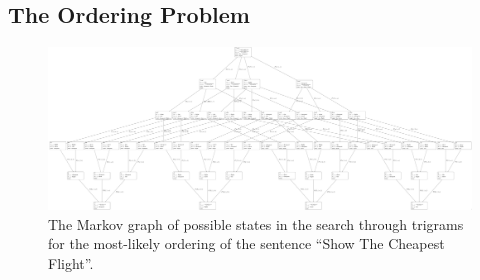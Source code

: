 \documentclass[11pt]{article}
\theoremstyle{plain}
\theoremstyle{definition}
\DeclareMathOperator*{\argmin}{argmin}
\begin{document}

\subsection{The Ordering Problem} \label{ordering}
\begin{figure}
	\centering 
	\includegraphics[scale=0.15]{markov_reordering2}
	\caption{The Markov graph of possible states in the search through trigrams for the most-likely ordering of the sentence 
		``Show The Cheapest Flight''.}
	\label{markov_diagram}
\end{figure}
\end{document}
